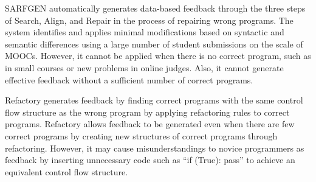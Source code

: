 \documentclass[10pt,conference]{IEEEtran}
\begin{document}
        SARFGEN\cite{wang2018search} automatically generates data-based feedback through the three steps of Search, Align, and Repair in the process of repairing wrong programs. The system identifies and applies minimal modifications based on syntactic and semantic differences using a large number of student submissions on the scale of MOOCs. However, it cannot be applied when there is no correct program, such as in small courses or new problems in online judges. Also, it cannot generate effective feedback without a sufficient number of correct programs.
        
        Refactory\cite{hu2019re} generates feedback by finding correct programs with the same control flow structure as the wrong program by applying refactoring rules to correct programs. Refactory allows feedback to be generated even when there are few correct programs by creating new structures of correct programs through refactoring. However, it may cause misunderstandings to novice programmers as feedback by inserting unnecessary code such as ``if (True): pass'' to achieve an equivalent control flow structure.
        
\end{document}
